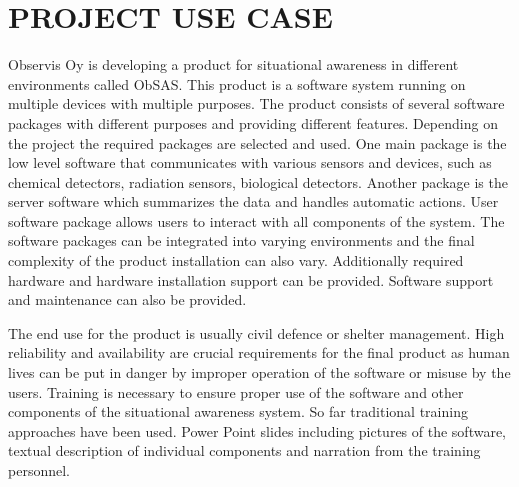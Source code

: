 \documentclass[12pt, a4paper,oneside, nocenter]{thesis}
\begin{document}
\chapter{\MakeUppercase{Project use case}}
Observis Oy is developing a product for situational awareness in different environments called ObSAS. This product is a software system running on multiple devices with multiple purposes. The product consists of several software packages with different purposes and providing different features. Depending on the project the required packages are selected and used. One main package is the low level software that communicates with various sensors and devices, such as chemical detectors, radiation sensors, biological detectors. Another package is the server software which summarizes the data and handles automatic actions. User software package allows users to interact
with all components of the system. The software packages can be integrated into varying environments and the final complexity of the product installation can also vary. Additionally required hardware and hardware installation support can be provided. Software support and maintenance can also be provided.
\par
The end use for the product is usually civil defence or shelter management. High reliability and availability are crucial requirements for the final product as human lives can be put in danger by improper operation of the software or misuse by the users. Training is necessary to ensure proper use of the software and 
other components of the situational awareness system. So far traditional training approaches have been used. Power Point slides including pictures of the software, textual description of individual components and narration from the training personnel.
\par
\end{document}
